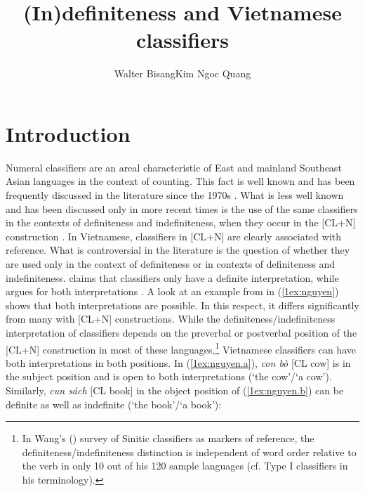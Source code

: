 \documentclass[output=paper]{langsci/langscibook}
\author{Walter Bisang\affiliation{Johannes Gutenberg University, Mainz \& Zhejiang University}\lastand Kim Ngoc Quang\affiliation{Johannes Gutenberg University, Mainz \& University of Social Sciences and Humanities, Ho Chi Minh City} }
\title{(In)definiteness and Vietnamese classifiers}
\begin{document}
\maketitle


\section{Introduction}\label{1sec:1}

Numeral classifiers are an areal characteristic of East  and mainland Southeast Asian languages  in the context of counting. This fact is well known and has been frequently discussed in the literature since the 1970s \citep{greenberg:72}. What is less well known and has been discussed only in more recent times is the use of the same classifiers in the contexts of definiteness and indefiniteness, when they occur in the [CL+N] construction 
\citep[bare classifier construction; cf.][]{bisang:99,cheng:sybesma:99,simpson:05,wu:bodomo:09,li:bisang:12,jiang:15,simpson:17,bisang:wu:17}. 
In Vietnamese, classifiers in [CL+N] are clearly associated with reference. What is controversial in the literature is the question of whether they are used only in the context of definiteness or in contexts of definiteness and indefiniteness. \citet{tran:11} claims that classifiers only have a definite interpretation, while \citet{nguyen:04} argues for both interpretations \citep[see also][]{trinh:11}. A look at an example from \citet{nguyen:04} in (\ref{1ex:nguyen}) shows that both interpretations are possible. In this respect, it differs significantly from many  with [CL+N] constructions. While the definiteness/indefiniteness interpretation of classifiers depends on the preverbal or postverbal position of the [CL+N] construction in most of these languages,\footnote{In Wang's (\citeyear{wang:15}) survey of Sinitic  classifiers as markers of reference, the definiteness/indefiniteness distinction is independent of word order relative to the verb in only 10 out of his 120 sample languages (cf. Type I classifiers in his terminology).} Vietnamese classifiers can have both interpretations in both positions. In (\ref{1ex:nguyen.a}), {\emph{con b\`o}} [CL cow] is in the subject position and is open to both interpretations (`the cow'/`a cow'). Similarly, {\emph{cu{\dao}n s\'ach}}  [CL book] in the object position of (\ref{1ex:nguyen.b}) can be definite as well as indefinite (`the book'/`a book'):
\end{document}
